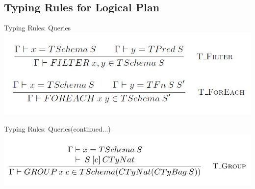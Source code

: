 \subsection{Typing Rules for Logical Plan}
\begin{frame}{Typing Rules: Queries}
\centering
\includegraphics[scale=0.4]{Images/TypingRules/FilterForeach.JPG}
\end{frame}

\begin{frame}{Typing Rules: Queries(continued...)}
\centering
\includegraphics[scale=0.4]{Images/TypingRules/Group.JPG}
\end{frame}

